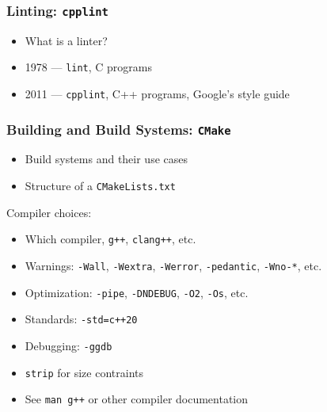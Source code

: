 \documentclass{beamer} \usetheme{Madrid}
\begin{document}
\begin{frame}
    \frametitle{Linting: \texttt{cpplint}}
    \vfill
    \begin{itemize}
        \item What is a linter?
        \item 1978 --- \texttt{lint}, C programs
        \item 2011 --- \texttt{cpplint}, C++ programs, Google's style guide
    \end{itemize}
    \vfill
\end{frame}

\begin{frame}
    \frametitle{Building and Build Systems: \texttt{CMake}}
    \vfill
    \begin{itemize}
        \item Build systems and their use cases
        \item Structure of a \texttt{CMakeLists.txt}
    \end{itemize}
    \vfill
    Compiler choices:
    \begin{itemize}
        \item Which compiler, \texttt{g++}, \texttt{clang++}, etc.
        \item Warnings: \texttt{-Wall}, \texttt{-Wextra}, \texttt{-Werror}, \texttt{-pedantic}, \texttt{-Wno-*}, etc.
        \item Optimization: \texttt{-pipe}, \texttt{-DNDEBUG}, \texttt{-O2}, \texttt{-Os}, etc.
        \item Standards: \texttt{-std=c++20}
        \item Debugging: \texttt{-ggdb}
        \item \texttt{strip} for size contraints
        \item See \texttt{man g++} or other compiler documentation
    \end{itemize}
    \vfill
\end{frame}
\end{document}

